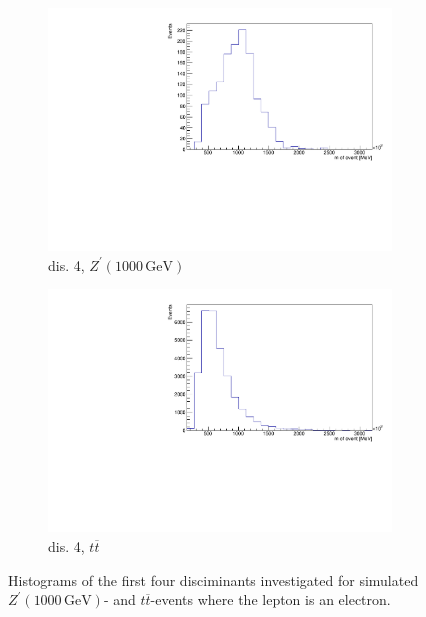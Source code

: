 \begin{figure}[H]
  \begin{subfigure}{0.45\textwidth}%
    \centering%
    \includegraphics[width=\textwidth]{plots/discriminant/zprime1000.el_dis4.pdf}%
    \caption{dis. 4, $Z^\prime(1000 \, \si{\giga\eV})$}%
    \label{fig:5g}%
  \end{subfigure}%
  \hfill
  \begin{subfigure}{0.45\textwidth}%
    \centering%
    \includegraphics[width=\textwidth]{plots/discriminant/ttbar.el_dis4.pdf}%
    \caption{dis. 4, $t \overline{t}$}%
    \label{fig:5h}%
  \end{subfigure}%
  \caption{Histograms of the first four disciminants investigated for simulated $Z^\prime(1000 \, \si{\giga\eV})$- and $t \overline{t}$-events where the lepton 
  is an electron.}%
  \label{fig:5}%
\end{figure}

